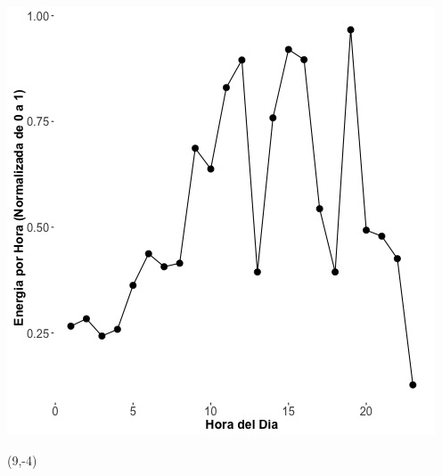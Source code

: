 \documentclass{article}\usepackage[]{graphicx}\usepackage[]{color}
\newenvironment{knitrout}{}{} %
\begin{document}
\begin{knitrout}
\color{fgcolor}
\includegraphics[scale=0.75]{figure/A26_fplot_norm_median} 
\end{knitrout}


 \begin{textblock}{1}(9,-4)
\begin{minipage}{20em}
\begingroup

\endgroup
\end{minipage}
\end{textblock}

 \vspace{2cm}


%
\end{document}
